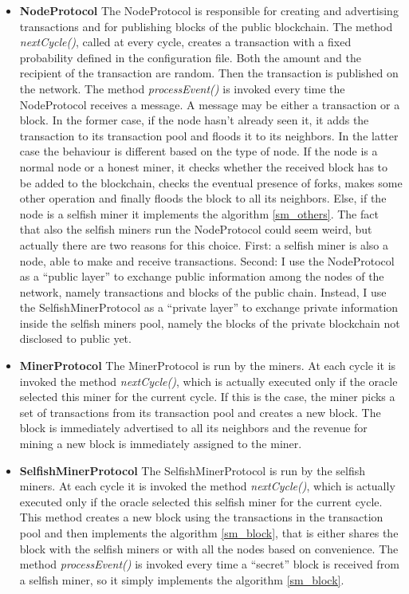 \documentclass{article}
\begin{document}
\begin{itemize}
\item \textbf{NodeProtocol} The NodeProtocol is responsible for creating and advertising transactions and for publishing blocks of the public blockchain. The method \textit{nextCycle()}, called at every cycle, creates a transaction with a fixed probability defined in the configuration file. Both the amount and the recipient of the transaction are random. Then the transaction is published on the network. The method \textit{processEvent()} is invoked every time the NodeProtocol receives a message. A message may be either a transaction or a block. In the former case, if the node hasn't already seen it, it adds the transaction to its transaction pool and floods it to its neighbors. In the latter case the behaviour is different based on the type of node. If the node is a normal node or a honest miner, it checks whether the received block has to be added to the blockchain, checks the eventual presence of forks, makes some other operation and finally floods the block to all its neighbors. Else, if the node is a selfish miner it implements the algorithm \ref{sm_others}. The fact that also the selfish miners run the NodeProtocol could seem weird, but actually there are two reasons for this choice. First: a selfish miner is also a node, able to make and receive transactions. Second: I use the NodeProtocol as a ``public layer'' to exchange public information among the nodes of the network, namely transactions and blocks of the public chain. Instead, I use the SelfishMinerProtocol as a ``private layer'' to exchange private information inside the selfish miners pool, namely the blocks of the private blockchain not disclosed to public yet. 
\item \textbf{MinerProtocol} The MinerProtocol is run by the miners. At each cycle it is invoked the method \textit{nextCycle()}, which is actually executed only if the oracle selected this miner for the current cycle. If this is the case, the miner picks a set of transactions from its transaction pool and creates a new block. The block is immediately advertised to all its neighbors and the revenue for mining a new block is immediately assigned to the miner.  
\item \textbf{SelfishMinerProtocol} The SelfishMinerProtocol is run by the selfish miners. At each cycle it is invoked the method \textit{nextCycle()}, which is actually executed only if the oracle selected this selfish miner for the current cycle. This method creates a new block using the transactions in the transaction pool and then implements the algorithm \ref{sm_block}, that is either shares the block with the selfish miners or with all the nodes based on convenience. The method \textit{processEvent()} is invoked every time a ``secret'' block is received from a selfish miner, so it simply implements the algorithm \ref{sm_block}.
\end{itemize}
\end{document}
